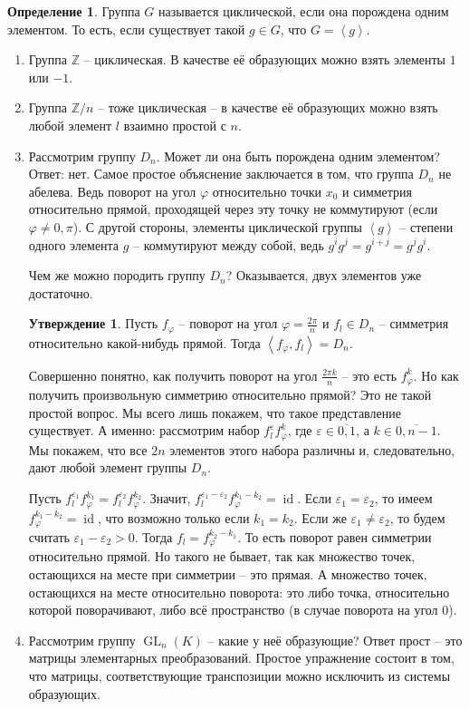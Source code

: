 \documentclass[10pt,a4paper,oneside]{book}
\theoremstyle{definition}
\newtheorem*{defn}{\color{yellow!30!red} Определение}
\newtheorem{utvr}{\color{blue!50!black}Утверждение}
\newcommand{\mb}[1]{\mathbb{#1}}
\newcommand{\ovl}{\overline}
\newcommand{\id}{\operatorname{id}}
\newcommand{\GL}{\operatorname{GL}}
\def\exm{\noindent {\bf Примеры:}}
\def\ffi{\varphi}
\def\eps{\varepsilon}
\def\lan{\left\langle }
\def\ran{\right\rangle}
\def\dfn{\begin{defn}}
\def\edfn{\end{defn}}
\def\enm{\begin{enumerate}}
\def\eenm{\end{enumerate}}
\def\utv{\begin{utvr}}
\def\eutv{\end{utvr}}
\begin{document}
\dfn Группа $G$ называется циклической, если она порождена одним элементом. То есть, если существует такой $g\in G$, что $G=\lan g \ran$.
\edfn

\exm
\enm
\item Группа $\mb Z$ -- циклическая. В качестве её образующих можно взять элементы $1$ или $-1$.
\item Группа $\mb Z/n$ -- тоже циклическая -- в качестве её образующих можно взять любой элемент $l$ взаимно простой с $n$.
\item Рассмотрим группу $D_n$. Может ли она быть порождена одним элементом? Ответ: нет. Самое простое объяснение заключается в том, что группа $D_n$ не абелева. Ведь поворот на угол $\ffi$ относительно точки $x_0$ и симметрия относительно прямой, проходящей через эту точку не коммутируют (если $\ffi \neq 0, \pi $). С другой стороны, элементы циклической группы $\lan g\ran$ -- степени одного элемента $g$ -- коммутируют между собой, ведь $g^ig^j=g^{i+j}=g^jg^i$.

Чем же можно породить группу $D_n$? Оказывается, двух элементов уже достаточно.

\utv Пусть $f_{\ffi}$ -- поворот на угол   $\ffi=\frac{2\pi}{n}$ и $f_l \in D_n$ -- симметрия относительно какой-нибудь прямой.
Тогда $\lan f_{\ffi},f_l\ran =D_n$.
\eutv
\proof
Совершенно понятно, как получить поворот на угол $\frac{2\pi k}n$ -- это есть $f_{\ffi}^k$. Но как получить произвольную симметрию относительно прямой? Это не такой простой вопрос. Мы всего лишь покажем, что такое представление существует. А именно: рассмотрим набор $f_l^{\eps} f_{\ffi}^k$, где $\eps\in \ovl{0,1}$, а $k\in \ovl{0,n-1}$.  Мы покажем, что все $2n$ элементов этого набора различны и, следовательно, дают любой элемент группы $D_n$. 

Пусть $f_l^{\eps_1}f_{\ffi}^{k_1}=f_l^{\eps_2}f_{\ffi}^{k_2}$. Значит, $f_l^{\eps_1-\eps_2}f_{\ffi}^{k_1-k_2}=\id$.
Если $\eps_1=\eps_2$, то имеем $f_{\ffi}^{k_1-k_2}=\id$, что возможно только если $k_1=k_2$. Если же $\eps_1\neq \eps_2$, то будем считать $\eps_1-\eps_2>0$. Тогда $f_{l}=f_{\ffi}^{k_2-k_1}$. То есть поворот равен симметрии относительно прямой. Но такого не бывает, так как множество точек, остающихся на месте при симметрии -- это прямая. А множество точек, остающихся на месте относительно поворота: это либо точка, относительно которой поворачивают, либо всё пространство (в случае поворота на угол $0$).
\endproof

\item Рассмотрим группу $\GL_n(K)$ -- какие у неё образующие? Ответ прост -- это матрицы элементарных преобразований. Простое упражнение состоит в том, что матрицы, соответствующие транспозиции можно исключить из системы образующих.
\eenm
\end{document}
